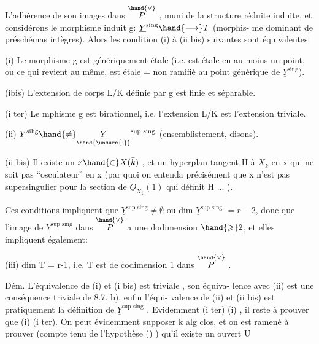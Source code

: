 
L'adhérence de son images dans $\overset{\hand{\vee}}{P}$ , muni de la structure réduite
induite, et considérons le morphisme induit g: $\underline{Y}^{\text{sing}} \hand{\longrightarrow} T$  (morphis-%
me dominant de préschémas  intègres). Alors les condition
(i) à (ii bis) suivantes sont équivalentes:

(i) Le morphisme g est génériquement  étale (i.e. est  étale en au moins un point, ou ce qui revient au même, est étale = non ramifié
au point générique de $\underline{Y}^{\text{sing}}$).

(ibis) L'extension de corps L/K définie par g est finie et
séparable.

(i ter) Le mphisme g est birationnel, i.e. l'extension L/K est
l'extension triviale.

(ii) $\underline{Y}^{\text{sihg}} \hand{\neq} \underset{\hand{\unsure{\cdot}}}{\underline{Y}}^{\text{sup sing}}$ (ensemblistement, disons).

(ii bis) Il existe un $x \hand{\in} X(\bar{k})$ , et un hyperplan tangent H à $X_{\bar{k}}$
en x qui ne soit pas ``osculateur'' en x (par quoi on entenda précisément
que x n'est pas supersingulier pour la section de $\underline{O}_{X_{\bar{k}}}(1)$ qui définit
H ... ).

Ces conditions impliquent que $\underline{Y}^{\text{sup sing}} \neq \emptyset$ ou dim $\underline{Y}^{\text{sup sing}}$ $= r-2$, donc que
l'image de $\underline{Y}^{\text{sup sing}}$ dans $\overset{\hand{\vee}}{P}$ a une dodimension $\hand{\geqslant} 2$, et  elles impliquent
également:

(iii) dim T = r-1, i.e. T est de codimension 1 dans $\overset{\hand{\vee}}{P}$ .

Dém. L'équivalence de (i) et (i bis) est triviale , son équiva-%
lence avec (ii) est une conséquence triviale de 8.7. b), enfin l'équi-%
valence de (ii) et (ii bis) est pratiquement la définition de
$\underline{Y}^{\text{sup sing}}$ . Evidemment (i ter) \hand{$\Longrightarrow$}(i) , il reste à prouver que (i)\hand{$\Longrightarrow$}
(i ter). On peut évidemment supposer k alg clos, et on est ramené à
prouver (compte tenu de l'hypothèse () ) qu'il existe un ouvert U\hand{$\neq\emptyset$}

